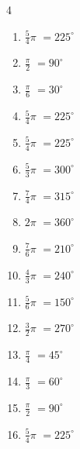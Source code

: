 \begin{multicols}{4}
\begin{enumerate}
  \item $\displaystyle \frac{5}{4}\pi$
        $\displaystyle =225^{\circ}$

  \item $\displaystyle \frac{\pi}{2}$
        $\displaystyle =90^{\circ}$

  \item $\displaystyle \frac{\pi}{6}$
        $\displaystyle =30^{\circ}$

  \item $\displaystyle \frac{5}{4}\pi$
        $\displaystyle =225^{\circ}$

  \item $\displaystyle \frac{5}{4}\pi$
        $\displaystyle =225^{\circ}$

\columnbreak %

\resetques

  \item $\displaystyle \frac{5}{3}\pi$
        $\displaystyle =300^{\circ}$

  \item $\displaystyle \frac{7}{4}\pi$
        $\displaystyle =315^{\circ}$

  \item $\displaystyle 2\pi$
        $\displaystyle =360^{\circ}$

  \item $\displaystyle \frac{7}{6}\pi$
        $\displaystyle =210^{\circ}$

  \item $\displaystyle \frac{4}{3}\pi$
        $\displaystyle =240^{\circ}$

  \item $\displaystyle \frac{5}{6}\pi$
        $\displaystyle =150^{\circ}$

  \item $\displaystyle \frac{3}{2}\pi$
        $\displaystyle =270^{\circ}$

  \item $\displaystyle \frac{\pi}{4}$
        $\displaystyle =45^{\circ}$

  \item $\displaystyle \frac{\pi}{3}$
        $\displaystyle =60^{\circ}$

  \item $\displaystyle \frac{\pi}{2}$
        $\displaystyle =90^{\circ}$

  \item $\displaystyle \frac{5}{4}\pi$
        $\displaystyle =225^{\circ}$


\end{enumerate}
\end{multicols}
